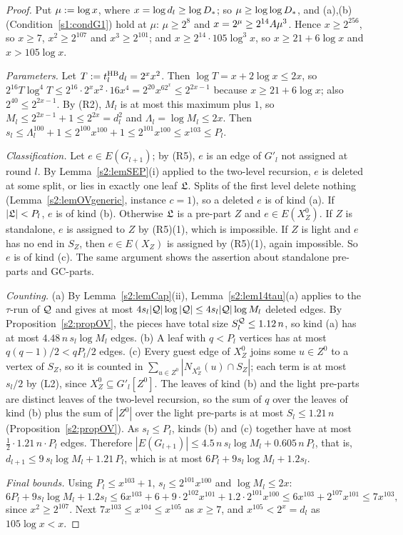 \begin{proof}
Put $\mu\mathrel{:=}\log x$, where $x=\log d_l\ge\log D_{*}$; so $\mu\ge\log\log D_{*}$,
and (a),(b) (Condition~\ref{s1:condG1}) hold at $\mu$: $\mu\ge2^8$ and
$x=2^\mu\ge2^{14}A\mu^3$. Hence $x\ge2^{256}$, so $x\ge7$, $x^2\ge2^{107}$ and
$x^3\ge2^{101}$; and $x\ge2^{14}\cdot105\log^3x$, so $x\ge21+6\log x$ and
$x>105\log x$.

\emph{Parameters.} Let $T\mathrel{:=}t^{\mathrm{HB}}_ld_l=2^xx^2$. Then $\log T=x+2\log x\le2x$,
so $2^{16}T\log^4T\le2^{16}\cdot2^xx^2\cdot16x^4=2^{20}x^62^x\le2^{2x-1}$ because
$x\ge21+6\log x$; also $2^{40}\le2^{2x-1}$. By (R2), $M_l$ is at most this
maximum plus $1$, so $M_l\le2^{2x-1}+1\le2^{2x}=d_l^2$ and
$\Lambda_l=\log M_l\le2x$. Then $s_l\le\Lambda_l^{100}+1\le2^{100}x^{100}+1\le
2^{101}x^{100}\le x^{103}\le P_l$.

\emph{Classification.} Let $e\in E(G_{l+1})$; by (R5), $e$ is an edge of $G'_l$
not assigned at round $l$. By Lemma~\ref{s2:lemSEP}(i) applied to the two-level
recursion, $e$ is deleted at some split, or lies in exactly one leaf $\mathfrak{L}$.
Splits of the first level delete nothing (Lemma~\ref{s2:lemOVgeneric}, instance
$c=1$), so a deleted $e$ is of kind (a). If $|\mathfrak{L}|<P_l$, $e$ is of kind (b).
Otherwise $\mathfrak{L}$ is a pre-part $Z$ and $e\in E(X^0_Z)$. If $Z$ is standalone,
$e$ is assigned to $Z$ by (R5)(1), which is impossible. If $Z$ is light and $e$
has no end in $S_Z$, then $e\in E(X_Z)$ is assigned by (R5)(1), again
impossible. So $e$ is of kind (c). The same argument shows the assertion about
standalone pre-parts and GC-parts.

\emph{Counting.} (a) By Lemma~\ref{s2:lemCap}(ii), Lemma~\ref{s2:lem14tau}(a)
applies to the $\tau$-run of $\mathcal{Q}$ and gives at most
$4s_l|\mathcal{Q}|\log|\mathcal{Q}|\le4s_l|\mathcal{Q}|\log M_l$ deleted edges. By
Proposition~\ref{s2:propOV}, the pieces have total size
$S^{\mathcal{Q}}_l\le1.12\,n$, so kind (a) has at most $4.48\,n\,s_l\log M_l$ edges.
(b) A leaf with $q<P_l$ vertices has at most $q(q-1)/2<qP_l/2$ edges.
(c) Every guest edge of $X^0_Z$ joins some $u\in Z^0$ to a vertex of $S_Z$, so
it is counted in $\sum_{u\in Z^0}|N_{X^0_Z}(u)\cap S_Z|$; each term is at most
$s_l/2$ by (L2), since $X^0_Z\subseteq G'_l[Z^0]$. The leaves of kind (b) and
the light pre-parts are distinct leaves of the two-level recursion, so the sum
of $q$ over the leaves of kind (b) plus the sum of $|Z^0|$ over the light
pre-parts is at most $S_l\le1.21\,n$ (Proposition~\ref{s2:propOV}). As
$s_l\le P_l$, kinds (b) and (c) together have at most
$\frac12\cdot1.21\,n\cdot P_l$ edges. Therefore
$|E(G_{l+1})|\le4.5\,n\,s_l\log M_l+0.605\,n\,P_l$, that is,
$d_{l+1}\le9\,s_l\log M_l+1.21\,P_l$, which is at most
$6P_l+9s_l\log M_l+1.2s_l$.

\emph{Final bounds.} Using $P_l\le x^{103}+1$, $s_l\le2^{101}x^{100}$ and
$\log M_l\le2x$:
\[
6P_l+9s_l\log M_l+1.2s_l\le6x^{103}+6+9\cdot2^{102}x^{101}+1.2\cdot2^{101}x^{100}
\le6x^{103}+2^{107}x^{101}\le7x^{103},
\]
since $x^2\ge2^{107}$. Next $7x^{103}\le x^{104}\le x^{105}$ as $x\ge7$, and
$x^{105}<2^x=d_l$ as $105\log x<x$.
\end{proof}


